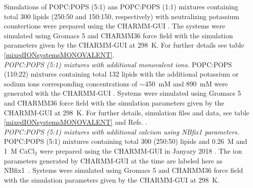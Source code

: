 \documentclass[journal=jpcbfk,manuscript=article]{achemso}
\newcommand{\todo}[1]{\textcolor{red}{#1}}
\begin{document}

Simulations of POPC:POPS (5:1) ans POPC:POPS (1:1) mixtures containing total 300 lipids (250:50 and 150:150, respectively)
with neutralizing potassium countertions 
were prepared
using the CHARMM-GUI \cite{lee16,jo18}. The systems were simulated using Gromacs 5 \cite{abraham2015gromacs}
and CHARMM36 force field with the simulation parameters given by the CHARMM-GUI at 298~K. For further details see table \ref{mixedIONsystemsMONOVALENT}. 
 \\

\noindent
{\it POPC:POPS (5:1) mixtures with additional monovalent ions.}
POPC:POPS (110:22) mixtures containing total 132 lipids with the additional
potassium or sodium ions corresponding concentrations of $\sim$450~mM and 890~mM
were generated with the CHARMM-GUI \cite{lee16,jo18}. Systems were simulated using
Gromacs 5 \cite{abraham2015gromacs} and CHARMM36 force field with the simulation
parameters given by the CHARMM-GUI at 298~K. For further details, simulation files
and data, see table \ref{mixedIONsystemsMONOVALENT} and
Refs. . \\


\noindent
{\it POPC:POPS (5:1) mixtures with additional calcium using NBfix1 parameters.} 
POPC:POPS (5:1) mixtures containing total 300 (250:50) lipids
and 0.26~M and 1~M CaCl$_2$ were prepared using the CHARMM-GUI in Janyary 2018 \cite{lee16,jo18}.
The ion parameters generated by CHARMM-GUI at the time are labeled here as NBfix1~\cite{kim16}.
Systems were simulated using Gromacs 5 \cite{abraham2015gromacs} and CHARMM36 force field with the simulation parameters given
by the CHARMM-GUI at 298~K. \\
\end{document}
